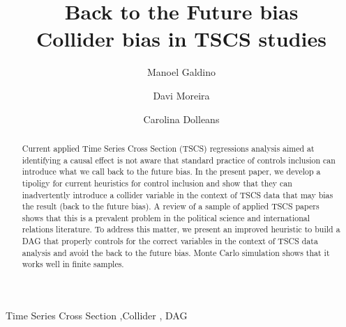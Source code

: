 \documentclass[
  super,
  preprint,
  3p]{elsarticle}
\begin{document}
\begin{frontmatter}
\title{Back to the Future bias \\\large{Collider bias in TSCS studies} }
\author[1]{Manoel Galdino%
%
}
\author[2]{Davi Moreira%
%
}
\author[3]{Carolina Dolleans%
%
}


        
\begin{abstract}
Current applied Time Series Cross Section (TSCS) regressions analysis
aimed at identifying a causal effect is not aware that standard practice
of controls inclusion can introduce what we call back to the future
bias. In the present paper, we develop a tipoligy for current heuristics
for control inclusion and show that they can inadvertently introduce a
collider variable in the context of TSCS data that may bias the result
(back to the future bias). A review of a sample of applied TSCS papers
shows that this is a prevalent problem in the political science and
international relations literature. To address this matter, we present
an improved heuristic to build a DAG that properly controls for the
correct variables in the context of TSCS data analysis and avoid the
back to the future bias. Monte Carlo simulation shows that it works well
in finite samples.
\end{abstract}





\begin{keyword}
    Time Series Cross Section \sep Collider \sep 
    DAG
\end{keyword}
\end{frontmatter}
    \ifdefined\Shaded\renewenvironment{Shaded}{\begin{tcolorbox}[boxrule=0pt, breakable, sharp corners, borderline west={3pt}{0pt}{shadecolor}, interior hidden, enhanced, frame hidden]}{\end{tcolorbox}}\fi
\end{document}
